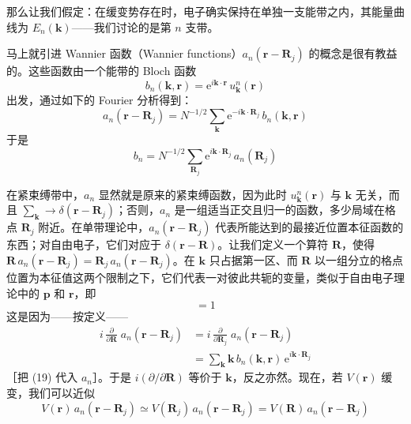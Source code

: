 那么让我们假定：在缓变势存在时，电子确实保持在单独一支能带之内，其能量曲线为 $E_n(\mathbf{k})$——我们讨论的是第 $n$ 支带。


马上就引进 Wannier 函数（Wannier functions）$a_n(\mathbf{r} - \mathbf{R}_j)$ 的概念是很有教益的。这些函数由一个能带的 Bloch 函数
\begin{equation*}
b_n(\mathbf{k},\mathbf{r}) = \mathrm{e}^{i\mathbf{k}\cdot\mathbf{r}}\, u^n_{\mathbf{k}}(\mathbf{r})
\end{equation*}
出发，通过如下的 Fourier 分析得到：
\begin{equation*}
a_n(\mathbf{r} - \mathbf{R}_j) = N^{-1/2} \sum_{\mathbf{k}} \mathrm{e}^{-i\mathbf{k}\cdot\mathbf{R}_j}\, b_n(\mathbf{k},\mathbf{r}) \tag{19}
\end{equation*}
于是
\begin{equation*}
b_n = N^{-1/2} \sum_{\mathbf{R}_j} \mathrm{e}^{i\mathbf{k}\cdot\mathbf{R}_j}\, a_n(\mathbf{R}_j)
\end{equation*}

在紧束缚带中，$a_n$ 显然就是原来的紧束缚函数，因为此时 $u^n_{\mathbf{k}}(\mathbf{r})$ 与 $\mathbf{k}$ 无关，而且 $\sum_{\mathbf{k}} \to \delta(\mathbf{r} - \mathbf{R}_j)$；否则，$a_n$ 是一组适当正交且归一的函数，多少局域在格点 $\mathbf{R}_j$ 附近。在单带理论中，$a_n(\mathbf{r} - \mathbf{R}_j)$ 代表所能达到的最接近位置本征函数的东西；对自由电子，它们对应于 $\delta(\mathbf{r} - \mathbf{R})$。让我们定义一个算符 $\mathbf{R}$，使得 $\mathbf{R}\, a_n(\mathbf{r} - \mathbf{R}_j) = \mathbf{R}_j\, a_n(\mathbf{r} - \mathbf{R}_j)$。在 $\mathbf{k}$ 只占据第一区、而 $\mathbf{R}$ 以一组分立的格点位置为本征值这两个限制之下，它们代表一对彼此共轭的变量，类似于自由电子理论中的 $\mathbf{p}$ 和 $\mathbf{r}$，即
\begin{equation*}
[\mathbf{k}, \mathbf{R}] = 1
\end{equation*}
这是因为——按定义——
\begin{align*}
i\,\frac{\partial}{\partial\mathbf{R}}\; a_n(\mathbf{r} - \mathbf{R}_j) &= i\,\frac{\partial}{\partial\mathbf{R}_j}\; a_n(\mathbf{r} - \mathbf{R}_j) \\
&= \sum_{\mathbf{k}} \mathbf{k}\, b_n(\mathbf{k},\mathbf{r})\, \mathrm{e}^{i\mathbf{k}\cdot\mathbf{R}_j}
\end{align*}
［把 (19) 代入 $a_n$］。于是 $i(\partial/\partial\mathbf{R})$ 等价于 $\mathbf{k}$，反之亦然。现在，若 $V(\mathbf{r})$ 缓变，我们可以近似
\begin{equation*}
V(\mathbf{r})\, a_n(\mathbf{r} - \mathbf{R}_j) \simeq V(\mathbf{R}_j)\, a_n(\mathbf{r} - \mathbf{R}_j) = V(\mathbf{R})\, a_n(\mathbf{r} - \mathbf{R}_j)
\end{equation*}

